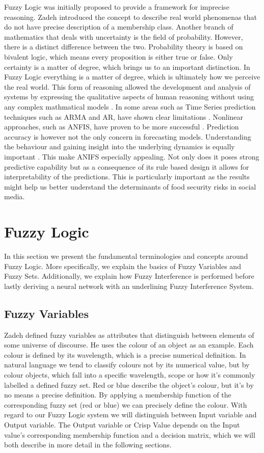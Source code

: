Fuzzy Logic was initially proposed to provide a framework for imprecise reasoning. Zadeh \cite{Zadeh65} introduced the concept to describe real world phenomenas that do not have precise description of a membership class. Another branch of mathematics that deals with uncertainty is the field of probability. However, there is a distinct difference between the two. Probability theory is based on bivalent logic, which means every proposition is either true or false. Only certainty is a matter of degree, which brings us to an important distinction. In Fuzzy Logic everything is a matter of degree, which is ultimately how we perceive the real world. This form of reasoning allowed the development and analysis of  systems by expressing the qualitative aspects of human reasoning without using any complex mathmatical models \cite{Jang91}.  
In some areas such as Time Series prediction techniques such as ARMA and AR, have shown clear limitations \cite{box90}. Nonlinear approaches, such as ANFIS, have proven to be more successful \cite{chap04}. Prediction accuracy is however not the only concern in forecasting models. Understanding the behaviour and gaining insight into the underlying dynamics is equally important \cite{neil93}. This make ANIFS especially appealing. Not only does it poses strong predictive capability but as a consequence of its rule based design it allows for interpretability of the predictions. This is particularly important as the results might help us better understand the determinants of food security risks in social media. 

\section{Fuzzy Logic}

In this section we present the fundamental terminologies and concepts around Fuzzy Logic. More specifically, we explain the basics of Fuzzy Variables and Fuzzy Sets.  Additionally, we explain how Fuzzy Interference is performed before lastly deriving a neural network with an underlining Fuzzy Interference System. 

\subsection {Fuzzy Variables }

Zadeh defined fuzzy variables as attributes that distinguish between elements of some universe of discourse. He uses the colour of an object as an example. Each colour is defined by its wavelength, which is a precise numerical definition. In natural language we tend to classify colours not by its numerical value, but by colour objects, which fall into a specific wavelength, scope or how it's commonly labelled a defined fuzzy set. Red or blue describe the object's colour, but it's by no means a precise definition. By applying a membership function of the corresponding fuzzy set (red or blue) we can precisely define the colour. With regard to our Fuzzy Logic system we will distinguish between Input variable and Output variable. The Output variable or Crisp Value depends on the Input value's corresponding membership function and a decision matrix, which we will both describe in more detail in the following sections.


